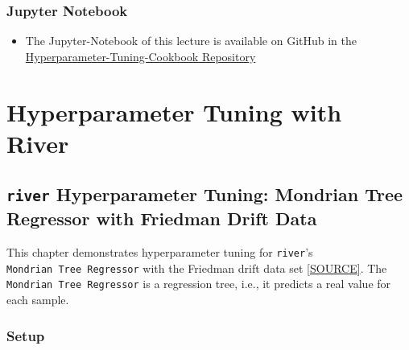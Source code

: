\documentclass[
  letterpaper,
  DIV=11,
  numbers=noendperiod]{scrreprt}
\providecommand{\tightlist}{%
  \setlength{\itemsep}{0pt}\setlength{\parskip}{0pt}}\usepackage{longtable,booktabs,array}
\begin{document}
\section{Jupyter Notebook}\label{jupyter-notebook-10}

\begin{tcolorbox}[enhanced jigsaw, rightrule=.15mm, coltitle=black, title=\textcolor{quarto-callout-note-color}{\faInfo}\hspace{0.5em}{Note}, opacitybacktitle=0.6, bottomrule=.15mm, opacityback=0, left=2mm, colback=white, leftrule=.75mm, colframe=quarto-callout-note-color-frame, colbacktitle=quarto-callout-note-color!10!white, toprule=.15mm, toptitle=1mm, bottomtitle=1mm, titlerule=0mm, breakable, arc=.35mm]

\begin{itemize}
\tightlist
\item
  The Jupyter-Notebook of this lecture is available on GitHub in the
  \href{https://github.com/sequential-parameter-optimization/Hyperparameter-Tuning-Cookbook/blob/main/015_num_spot_correlation_p.ipynb}{Hyperparameter-Tuning-Cookbook
  Repository}
\end{itemize}

\end{tcolorbox}

\part{Hyperparameter Tuning with River}

\chapter{\texorpdfstring{\texttt{river} Hyperparameter Tuning: Mondrian
Tree Regressor with Friedman Drift
Data}{river Hyperparameter Tuning: Mondrian Tree Regressor with Friedman Drift Data}}\label{sec-river-hpt-51}

This chapter demonstrates hyperparameter tuning for \texttt{river}'s
\texttt{Mondrian\ Tree\ Regressor} with the Friedman drift data set
\href{https://riverml.xyz/0.18.0/api/datasets/synth/FriedmanDrift/}{{[}SOURCE{]}}.
The \texttt{Mondrian\ Tree\ Regressor} is a regression tree, i.e., it
predicts a real value for each sample.

\section{Setup}\label{sec-setup-51}
\end{document}
